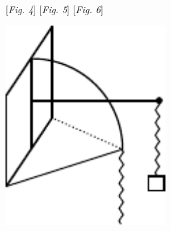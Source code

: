 \\
\hspace*{3mm} [\textit{Fig. 4}]\label{LH_35_14_02_039r2_Fig.4}\hspace*{34mm} [\textit{Fig. 5}] \label{LH_35_14_02_039r2_Fig.5}\hspace*{36mm} [\textit{Fig. 6}]\label{LH_35_14_02_039r2_Fig.6}
\vspace{1em}
\pend
%
\vspace{1.5em} 
\pstart {}
\hspace{12mm}\begin{minipage}[t]{0.5\textwidth}
\includegraphics[width=0.46\textwidth]{gesamttex/edit_VIII,3/images/LH_35_14_02_039r2_d8.pdf}
\end{minipage}
